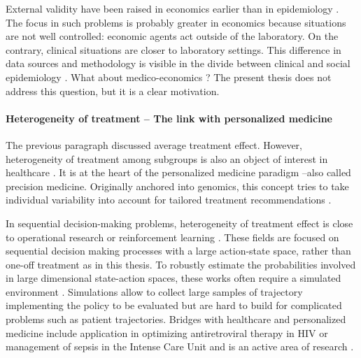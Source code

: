\documentclass[french,12pt,twoside,a4paper]{book}
\begin{document}
\begin{background_box_left}
  External validity have been raised in economics earlier than in epidemiology
  \citep{deaton2020randomization}. The focus in such problems is probably
  greater in economics because situations are not well controlled: economic
  agents act outside of the laboratory. On the contrary, clinical situations are
  closer to laboratory settings. This difference in data sources and methodology
  is visible in the divide between clinical and social epidemiology
  \citep{zielhuis2001social}. What about medico-economics ? The present thesis
  does not address this question, but it is a clear
  motivation.

  \paragraph{Heterogeneity of treatment -- The link with personalized medicine}

  The previous paragraph discussed average treatment effect. However,
  heterogeneity of treatment among subgroups is also an object of interest in
  healthcare \citep{hernan2020causal}. It is at the heart of the personalized
  medicine paradigm --also called precision medicine. Originally anchored into
  genomics, this concept tries to take individual variability into account for
  tailored treatment recommendations \citep{schork2015personalized,
    topol2019high}.

  In sequential decision-making problems, heterogeneity of treatment effect is
  close to operational research \citep{schaefer2004modeling} or reinforcement
  learning \citep{bareinboim2015bandits}. These fields are focused on sequential
  decision making processes with a large action-state space, rather than one-off
  treatment as in this thesis. To robustly estimate the probabilities involved
  in large dimensional state-action spaces, these works often require a
  simulated environment \citep{bennett2013artificial}. Simulations allow to
  collect large samples of trajectory implementing the policy to be evaluated
  but are hard to build for complicated problems such as patient trajectories.
  Bridges with healthcare and personalized medicine include application in
  optimizing antiretroviral therapy in HIV \citep{guez2008adaptive} or
  management of sepsis in the Intense Care Unit \citep{komorowski2018artificial}
  and is an active area of research \citep{coronato2020reinforcement}.

\end{background_box_left}
\end{document}
